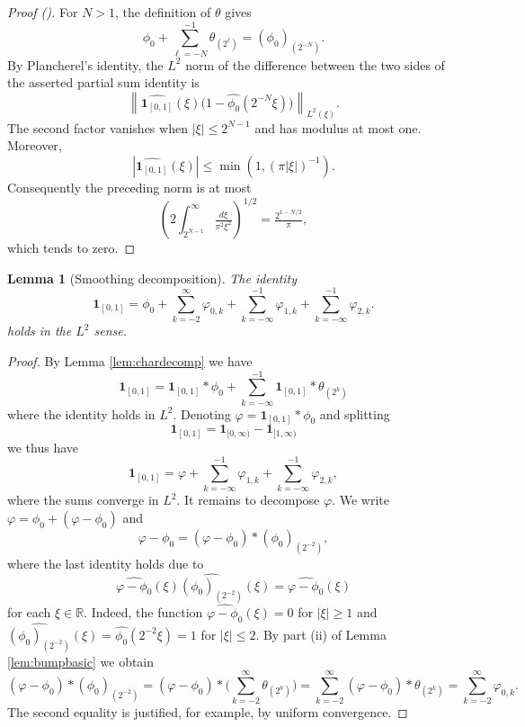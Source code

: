 \documentclass[12pt,reqno]{amsart}
\newcommand{\auto}{{({\tiny\faCar})}}
\theoremstyle{plain}
\newtheorem{lemma}[theorem]{Lemma}
\numberwithin{equation}{section}
\theoremstyle{remark}
\newcommand{\using}[1]{}
\newcommand{\R}{{\mathbb R}}
\begin{document}
\begin{proof}[Proof \auto]
For $N>1$, the definition of $\theta$ gives
\[
\phi_0+\sum_{\ell=-N}^{-1}\theta_{(2^\ell)}
=(\phi_0)_{(2^{-N})}.
\]
By Plancherel's identity, the $L^2$ norm of the difference between the two sides of the asserted partial sum identity is
\[
\left\|\widehat{\mathbf1_{[0,1]}}(\xi)
\bigl(1-\widehat{\phi_0}(2^{-N}\xi)\bigr)\right\|_{L^2(\xi)}.
\]
The second factor vanishes when $|\xi|\le2^{N-1}$ and has modulus at most one. Moreover,
\[
|\widehat{\mathbf1_{[0,1]}}(\xi)|
\le\min(1,(\pi|\xi|)^{-1}).
\]
Consequently the preceding norm is at most
\[
\left(2\int_{2^{N-1}}^\infty\tfrac{d\xi}{\pi^2\xi^2}\right)^{1/2}
=\tfrac{2^{1-N/2}}{\pi},
\]
which tends to zero.
\end{proof}


\begin{lemma}[Smoothing decomposition]\label{lem:smoothingdecomp}\using{lem:chardecomp}\using{lem:bumpbasic}
The identity
\begin{equation}\label{eq:seriesexpansion}
\mathbf{1}_{[0,1]} = \phi_0 + \sum_{k=-2}^\infty \varphi_{0,k}  + \sum_{k=-\infty}^{-1} \varphi_{1,k}+ \sum_{k=-\infty}^{-1}\varphi_{2,k}.
\end{equation}
holds in the $L^2$ sense.
\end{lemma}

\begin{proof}
By Lemma \ref{lem:chardecomp} we have
\begin{equation}
    \label{eq:L2char}
    \mathbf{1}_{[0,1]} =\mathbf{1}_{[0,1]}\ast\phi_0  +  \sum_{k=-\infty}^{-1} \mathbf{1}_{[0,1]}\ast  \theta_{(2^k)}
\end{equation}
where the identity holds in $L^2$.
Denoting $\varphi=\mathbf{1}_{[0,1]}\ast\phi_0$ and splitting
\[\mathbf{1}_{[0,1]} = \mathbf{1}_{[0,\infty)} - \mathbf{1}_{[1,\infty)}\]
 we  thus have
\[\mathbf{1}_{[0,1]} = \varphi +  \sum_{k=-\infty}^{-1} \varphi_{1,k}+ \sum_{k=-\infty}^{-1}\varphi_{2,k},\]
where the sums converge in $L^2$.
It remains to decompose $\varphi$.
We  write $\varphi= \phi_0 + (\varphi-\phi_0)$
and
\[
\varphi-\phi_0 = (\varphi - \phi_0)*(\phi_0)_{(2^{-2})},\]
where the last identity holds due to
\[\widehat{\varphi-\phi_0}(\xi) \widehat{(\phi_0)_{(2^{-2})}}(\xi) = \widehat{\varphi-\phi_0}(\xi) \]
for each $\xi\in \R$. Indeed, the function $\widehat{\varphi-\phi_0}(\xi)=0$ for $|\xi|\ge 1$ and $\widehat{(\phi_0)_{(2^{-2})}}(\xi) = \widehat{\phi_0}(2^{-2}\xi) =1$ for $|\xi|\le 2$.
By part (ii) of Lemma \ref{lem:bumpbasic} we obtain
\[ (\varphi - \phi_0)*(\phi_0)_{(2^{-2})} =  (\varphi - \phi_0)*\Big( \sum_{k=-2}^\infty \theta_{(2^k)}\Big )  =  \sum_{k=-2}^\infty (\varphi - \phi_0)*\theta_{(2^k)} =   \sum_{k=-2}^\infty \varphi_{0,k}.
\]
The  second equality is justified, for example, by uniform convergence.
\end{proof}
\end{document}
